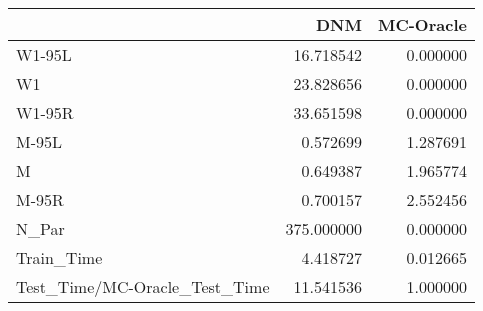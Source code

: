 \begin{tabular}{lrr}
\toprule
{} &         DNM &  MC-Oracle \\
\midrule
W1-95L                        &   16.718542 &   0.000000 \\
W1                            &   23.828656 &   0.000000 \\
W1-95R                        &   33.651598 &   0.000000 \\
M-95L                         &    0.572699 &   1.287691 \\
M                             &    0.649387 &   1.965774 \\
M-95R                         &    0.700157 &   2.552456 \\
N\_Par                         &  375.000000 &   0.000000 \\
Train\_Time                    &    4.418727 &   0.012665 \\
Test\_Time/MC-Oracle\_Test\_Time &   11.541536 &   1.000000 \\
\bottomrule
\end{tabular}
